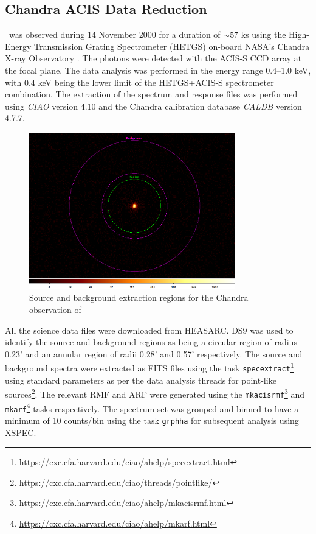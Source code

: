     	\subsection{Chandra ACIS Data Reduction} \label{multi-obs:red-analysis:acis}
    		\source\ was observed during 14 November 2000 for a duration of $\sim 57$ ks using the High-Energy Transmission Grating Spectrometer (HETGS) on-board NASA's Chandra X-ray Observatory \cite{beardaChandra2002AA}. The photons were detected with the ACIS-S CCD array at the focal plane. The data analysis was performed in the energy range 0.4--1.0 keV, with 0.4 keV being the lower limit of the HETGS+ACIS-S spectrometer combination. The extraction of the spectrum and response files was performed using \textit{CIAO} version 4.10 and the Chandra calibration database \textit{CALDB} version 4.7.7.
	    	\begin{figure}[!htb]
		        \centering
		        \includegraphics[width=0.8\textwidth]{images/rx-j0925-7-4758_644_src-bkg.png}
		        \caption{Source and background extraction regions for the Chandra observation of \source}
		        \label{fig:src-bkg:acis}
		    \end{figure}
	    	
	    	All the science data files were downloaded from HEASARC. DS9 was used to identify the source and background regions as being a circular region of radius 0.23' and an annular region of radii 0.28' and 0.57' respectively. The source and background spectra were extracted as FITS files using the task \texttt{specextract}\footnote{\url{https://cxc.cfa.harvard.edu/ciao/ahelp/specextract.html}} using standard parameters as per the data analysis threads for point-like sources\footnote{\url{https://cxc.cfa.harvard.edu/ciao/threads/pointlike/}}. The relevant RMF and ARF were generated using the \texttt{mkacisrmf}\footnote{\url{https://cxc.cfa.harvard.edu/ciao/ahelp/mkacisrmf.html}} and \texttt{mkarf}\footnote{\url{https://cxc.cfa.harvard.edu/ciao/ahelp/mkarf.html}} tasks respectively. The spectrum set was grouped and binned to have a minimum of 10 counts/bin using the task \texttt{grphha} for subsequent analysis using XSPEC.
    	
